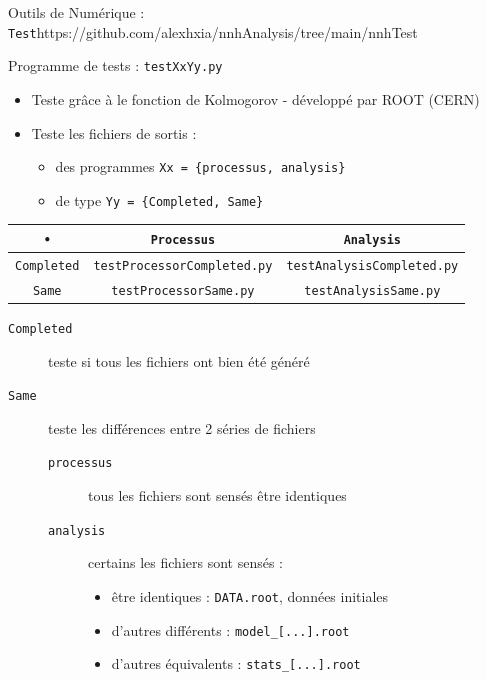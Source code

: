 \documentclass[9pt]{beamer}
\begin{document}
\begin{frame}{Outils de Numérique : \texttt{Test}}{https://github.com/alexhxia/nnhAnalysis/tree/main/nnhTest}

\begin{block}{Programme de tests : \texttt{testXxYy.py}}
	\begin{itemize}
		\item Teste grâce à le fonction de Kolmogorov - développé par ROOT (CERN)
		\item Teste les fichiers de sortis :
		\begin{itemize}
			\item des programmes \texttt{Xx = \{processus, analysis\}}
			\item de type \texttt{Yy = \{Completed, Same\}}
		\end{itemize}
	\end{itemize}
	\begin{tabular}{| c | c | c |}
		\hline
			\texttt{•} & \texttt{Processus} & \texttt{Analysis} \\
		\hline
			\texttt{Completed} & \texttt{testProcessorCompleted.py} & \texttt{testAnalysisCompleted.py} \\
		\hline
			\texttt{Same} & \texttt{testProcessorSame.py} & \texttt{testAnalysisSame.py} \\
		\hline
	\end{tabular}
	\begin{description}
		\item[\texttt{Completed}] teste si tous les fichiers ont bien été généré
		\item[\texttt{Same}]	teste les différences entre 2 séries de fichiers
		\begin{description}
			\item[\texttt{processus}] tous les fichiers sont sensés être identiques
			\item[\texttt{analysis}] certains les fichiers sont sensés :
            \begin{itemize}
                \item être identiques : \texttt{DATA.root}, données initiales 
                \item d'autres différents : \texttt{model\_[...].root}
                \item d'autres équivalents : \texttt{stats\_[...].root} 
            \end{itemize}
		\end{description}
	\end{description}
\end{block}

\end{frame}
\end{document}
